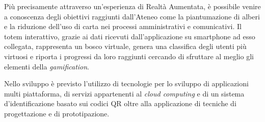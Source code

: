 Più precisamente attraverso un'esperienza di Realtà Aumentata, è possibile venire a conoscenza degli obiettivi raggiunti dall'Ateneo come la piantumazione di alberi e la riduzione dell'uso di carta nei processi amministrativi e comunicativi.
Il totem interattivo, grazie ai dati ricevuti dall'applicazione su smartphone ad esso collegata, rappresenta un bosco virtuale, genera una classifica degli utenti più virtuosi e riporta i progressi da loro raggiunti cercando di sfruttare al meglio gli elementi della \textit{gamification}.
\vspace{10pt}

Nello sviluppo è previsto l'utilizzo di tecnologie per lo sviluppo di applicazioni multi piattaforma, di servizi appartenenti al \textit{cloud computing} e di un sistema d'identificazione basato sui codici QR oltre alla applicazione di tecniche di progettazione e di prototipazione.
\vspace{10pt}

